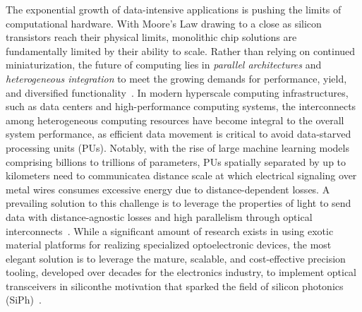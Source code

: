 The exponential growth of data-intensive applications is pushing the limits of computational hardware. With Moore's Law drawing to a close as silicon transistors reach their physical limits, monolithic chip solutions are fundamentally limited by their ability to scale. Rather than relying on continued miniaturization, the future of computing lies in \emph{parallel architectures} and \emph{heterogeneous integration} to meet the growing demands for performance, yield, and diversified functionality~\cite{iyerHeterogeneousIntegrationPerformance2016}. In modern hyperscale computing infrastructures, such as data centers and high-performance computing systems, the interconnects among heterogeneous computing resources have become integral to the overall system performance, as efficient data movement is critical to avoid data-starved processing units (PUs). Notably, with the rise of large machine learning models comprising billions to trillions of parameters, PUs spatially separated by up to kilometers need to communicate\textemdash{}a distance scale at which electrical signaling over metal wires consumes excessive energy due to distance-dependent losses. A prevailing solution to this challenge is to leverage the properties of light to send data with distance-agnostic losses and high parallelism through optical interconnects~\cite{millerRationaleChallengesOptical2000}. While a significant amount of research exists in using exotic material platforms for realizing specialized optoelectronic devices, the most elegant solution is to leverage the mature, scalable, and cost-effective precision tooling, developed over decades for the electronics industry, to implement optical transceivers in silicon\textemdash{}the motivation that sparked the field of silicon photonics (SiPh)~\cite{sorefPresentFutureSilicon2006}.

